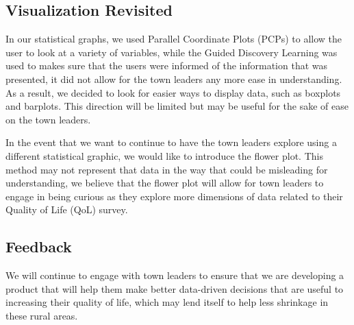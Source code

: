 \documentclass[letterpaper,inpress]{jdsart}
\begin{document}
\subsection{Visualization Revisited}

In our statistical graphs, we used Parallel Coordinate Plots (PCPs) to allow the user to look at a variety of variables, while the Guided Discovery Learning was used to makes sure that the users were informed of the information that was presented, it did not allow for the town leaders any more ease in understanding. As a result, we decided to look for easier ways to display data, such as boxplots and barplots. This direction will be limited but may be useful for the sake of ease on the town leaders.

In the event that we want to continue to have the town leaders explore using a different statistical graphic, we would like to introduce the flower plot. This method may not represent that data in the way that could be misleading for understanding, we believe that the flower plot will allow for town leaders to engage in being curious as they explore more dimensions of data related to their Quality of Life (QoL) survey.

\subsection{Feedback}

We will continue to engage with town leaders to ensure that we are developing a product that will help them make better data-driven decisions that are useful to increasing their quality of life, which may lend itself to help less shrinkage in these rural areas.



\end{document}
